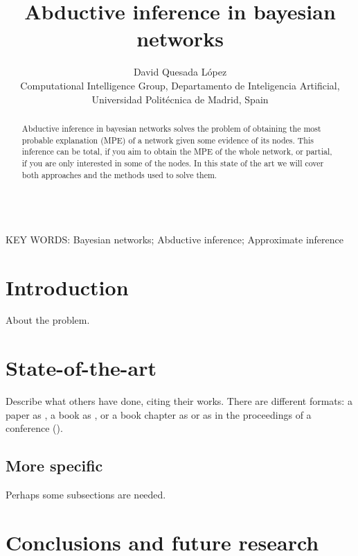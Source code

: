 \documentclass[a4paper,11pt]{article}
\begin{document}
\title{Abductive inference in bayesian networks}

\author{{David Quesada López}\\
{\small Computational Intelligence Group, Departamento de Inteligencia Artificial, Universidad Polit\'ecnica de Madrid, Spain}}

\date{}
\maketitle



\begin{abstract} Abductive inference in bayesian networks solves the problem of obtaining the most probable explanation (MPE) of a network given some evidence of its nodes. This inference can be total, if you aim to obtain the MPE of the whole network, or partial, if you are only interested in some of the nodes. In this state of the art we will cover both approaches and the methods used to solve them.
\end{abstract}


\ \\
KEY WORDS: Bayesian networks; Abductive inference; Approximate inference




\section{Introduction}

About the problem.



\section{State-of-the-art}

Describe what others have done, citing their works. There are different formats: a paper as \cite{uncu2007}, a book as \cite{hosmer-lemeshow2000}, or a book chapter as \cite{wold75} or as in the proceedings of a conference (\cite{shakhnarovich2001icml}).

    \subsection{More specific}


Perhaps some subsections are needed.

\section{Conclusions and future research}
\end{document}
